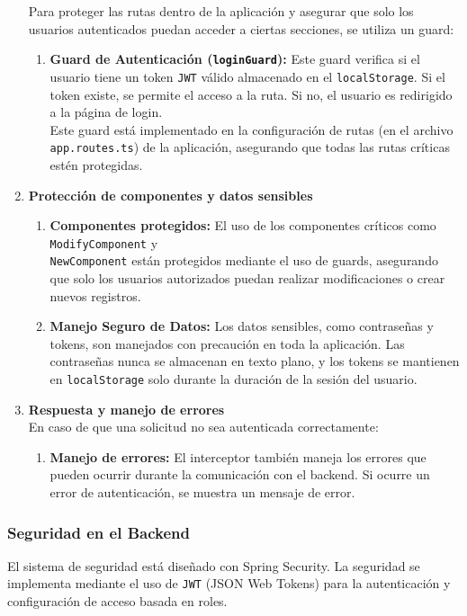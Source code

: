 \documentclass{article} %
\begin{document}
\begin{enumerate}
        \noindent Para proteger las rutas dentro de la aplicación y asegurar que solo los usuarios autenticados puedan acceder a ciertas secciones, se utiliza un guard:
        \begin{enumerate}
            \item \textbf{Guard de Autenticación (\texttt{loginGuard}):} Este guard verifica si el usuario tiene un token \texttt{JWT} válido almacenado en el \texttt{localStorage}. Si el token existe, se permite el acceso a la ruta. Si no, el usuario es redirigido a la página de login. \\
        Este guard está implementado en la configuración de rutas (en el archivo \texttt{app.routes.ts}) de la aplicación, asegurando que todas las rutas críticas estén protegidas.
        \end{enumerate}
        \item \textbf{Protección de componentes y datos sensibles}
        \begin{enumerate}
            \item \textbf{Componentes protegidos:} El uso de los componentes críticos como \texttt{ModifyComponent} y \\\texttt{NewComponent} están protegidos mediante el uso de guards, asegurando que solo los usuarios autorizados puedan realizar modificaciones o crear nuevos registros.
            \item \textbf{Manejo Seguro de Datos:} Los datos sensibles, como contraseñas y tokens, son manejados con precaución en toda la aplicación. Las contraseñas nunca se almacenan en texto plano, y los tokens se mantienen en \texttt{localStorage} solo durante la duración de la sesión del usuario.
        \end{enumerate}
        \item \textbf{Respuesta y manejo de errores}\\
        En caso de que una solicitud no sea autenticada correctamente:
        \begin{enumerate}
            \item \textbf{Manejo de errores:} El interceptor también maneja los errores que pueden ocurrir durante la comunicación con el backend. Si ocurre un error de autenticación, se muestra un mensaje de error.
        \end{enumerate}
    \end{enumerate}
    
    \subsubsection{Seguridad en el Backend}
    \noindent El sistema de seguridad está diseñado con Spring Security. La seguridad se implementa mediante el uso de \texttt{JWT} (JSON Web Tokens) para la autenticación y configuración de acceso basada en roles.
    
\end{document}

